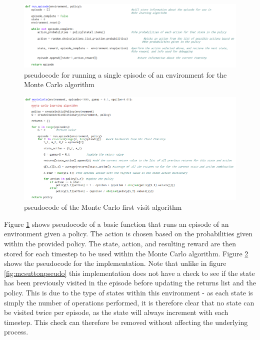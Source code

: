 \begin{figure}[h]
\includegraphics[width=\textwidth]{images/run}
\caption[run episode pseudocode for Monte Carlo]{pseudocode for running a single episode of an environment for the Monte Carlo algorithm}
\label{fig:mcrun}
\end{figure}

\begin{figure}[h]
\includegraphics[width=\textwidth]{images/mcpseudo}
\caption[Monte Carlo implementation pseudocode]{pseudocode of the Monte Carlo first visit algorithm}
\label{fig:mcpseudo}
\end{figure}
Figure \ref{fig:mcrun} shows pseudocode of a basic function that runs an episode of an environment given a policy. The action is chosen based on the probabilities given within the provided policy. The state, action, and resulting reward are then stored for each timestep to be used within the Monte Carlo algorithm. Figure \ref{fig:mcpseudo} shows the pseudocode for the implementation. Note that unlike in figure \ref{fig:mcsuttonpseudo} this implementation does not have a check to see if the state has been previously visited in the episode before updating the returns list and the policy. This is due to the type of states within this environment - as each state is simply the number of operations performed, it is therefore clear that no state can be visited twice per episode, as the state will always increment with each timestep. This check can therefore be removed without affecting the underlying process.


